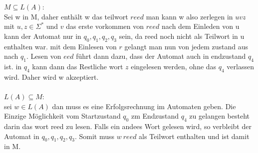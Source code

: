 $M\subseteq L(A)$:\\
Sei w in M, daher enthält w das teilwort $reed$ man kann w also zerlegen in $uvz$ mit $u,z\in \Sigma^*$ und $v$ das erste vorkommen von $reed$  nach dem Einleden von u kann der Automat nur in $q_0, q_1,q_2,q_3$ sein, da reed noch nicht als Teilwort in u enthalten war. mit dem Einlesen von $r$ gelangt man nun von jedem zustand aus nach $q_1$. Lesen von $eed$ führt dann dazu, dass der Automat auch in endzustand $q_4$ ist. in $q_4$ kann dann das Restliche wort $z$ eingelesen werden, ohne das $q_4$ verlassen wird. Daher wird w akzeptiert.\\
\\
$L(A)\subseteq M$:\\
sei $w \in L(A)$ dan muss es eine Erfolgsrechnung im Automaten geben. Die Einzige Möglichkeit vom Startzustand $q_0$ zm Endzustand $q_4$ zu gelangen besteht darin das wort reed zu lesen. Falls ein andees Wort gelesen wird, so verbleibt der Automat in $q_0, q_1,q_2,q_3$. Somit muss $w\ reed$ als Teilwort enthalten und ist damit in M.
